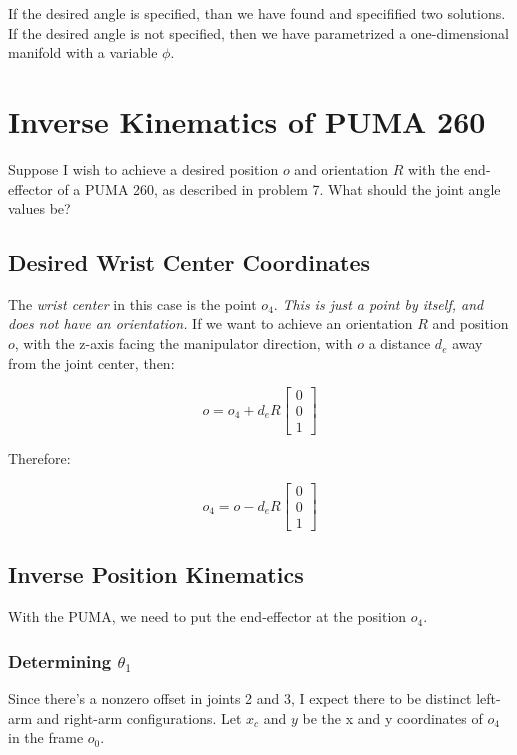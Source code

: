 \documentclass{article}
\begin{document}
If the desired angle is specified, than we have found and specifified
	two solutions.
If the desired angle is not specified, then we have parametrized a one-dimensional
	manifold with a variable $\phi$.

\section{Inverse Kinematics of PUMA 260}

Suppose I wish to achieve a desired position $o$ and orientation $R$ with
	the end-effector of a PUMA 260, as described in problem 7.
What should the joint angle values be?

\subsection{Desired Wrist Center Coordinates}

The \emph{wrist center} in this case is the point $o_4$.
\emph{This is just a point by itself, and does not have an orientation.}
If we want to achieve an orientation $R$ and position $o$,
	with the z-axis facing the manipulator direction, with
	$o$ a distance $d_e$ away from the joint center,
	then:

\[ o = o_4 + d_e R \left[ \begin{matrix} 0 \\ 0 \\ 1 \end{matrix} \right] \] 

Therefore:

\[ o_4 = o - d_e R \left[ \begin{matrix} 0 \\ 0 \\ 1 \end{matrix} \right] \]

\subsection{Inverse Position Kinematics}

With the PUMA, we need to put the end-effector at the position $o_4$.

\subsubsection{Determining $\theta_1$}

Since there's a nonzero offset in joints 2 and 3, I expect there
	to be distinct left-arm and right-arm configurations.
Let $x_c$ and $y$ be the x and y coordinates of $o_4$ in the frame $o_0$.
\end{document}
